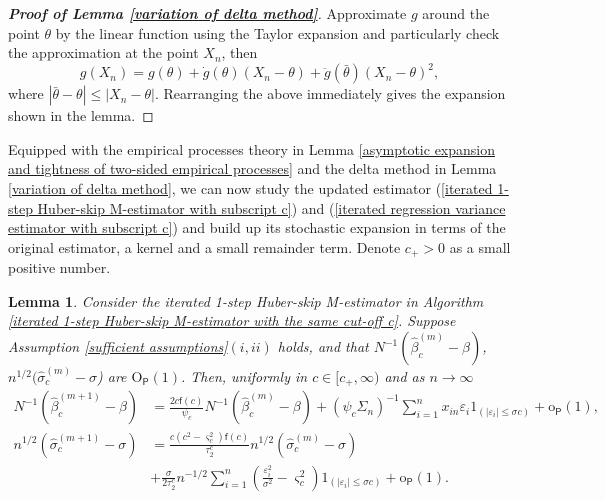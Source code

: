 \documentclass[11pt, letterpaper]{article}
\newtheorem{lemma}{Lemma}
\numberwithin{algorithm}{section}
\numberwithin{assumption}{section}
\numberwithin{lemma}{section}
\numberwithin{theorem}{section}
\numberwithin{corollary}{section}
\numberwithin{remark}{section}
\numberwithin{equation}{section}
\numberwithin{figure}{section}
\numberwithin{table}{section}
\begin{document}
\begin{proof}[\textnormal{\textbf{Proof of Lemma \ref{variation of delta method}}}]
Approximate $g$ around the point $\theta$ by the linear function using the Taylor expansion and particularly check the approximation at the point $X_{n}$, then
\begin{equation*}
g(X_{n}) = g(\theta) + \dot{g}(\theta) (X_{n} - \theta) + \ddot{g}(\bar{\theta}) (X_{n} - \theta)^{2},
\end{equation*}
where $|\bar{\theta} - \theta| \le |X_{n} - \theta|$. Rearranging the above immediately gives the expansion shown in the lemma.
\end{proof}

Equipped with the empirical processes theory in Lemma \ref{asymptotic expansion and tightness of two-sided empirical processes} and the delta method in Lemma \ref{variation of delta method}, we can now study the updated estimator (\ref{iterated 1-step Huber-skip M-estimator with subscript c}) and (\ref{iterated regression variance estimator with subscript c}) and build up its stochastic expansion in terms of the original estimator, a kernel and a small remainder term. Denote $c_{+} > 0$ as a small positive number.

\begin{lemma} \label{one step expansion of iterated estimators}
Consider the iterated 1-step Huber-skip M-estimator in Algorithm \ref{iterated 1-step Huber-skip M-estimator with the same cut-off c}. Suppose Assumption \ref{sufficient assumptions}$(i, ii)$ holds, and that $N^{-1} (\widehat{\beta}_{c}^{(m)} - \beta)$, $n^{1/2} (\widehat{\sigma}_{c}^{(m)} - \sigma$) are $\mathrm{O}_{\mathsf{P}}(1)$. Then, uniformly in $c \in [c_{+}, \infty)$ and as $n \to \infty$
\begin{align*}
N^{-1} (\widehat{\beta}_{c}^{(m+1)} - \beta) & = \frac{2c\mathsf{f}(c)}{\psi_{c}} N^{-1} (\widehat{\beta}_{c}^{(m)} - \beta) + (\psi_{c} \Sigma_{n})^{-1} \sum_{i=1}^{n} x_{in} \varepsilon_{i} 1_{(|\varepsilon_{i}| \le \sigma c)} + \mathrm{o}_{\mathsf{P}}(1), \\
n^{1/2} (\widehat{\sigma}_{c}^{(m+1)} - \sigma) & = \frac{c(c^{2} - \varsigma_{c}^{2})\mathsf{f}(c)}{\tau_{2}^{c}}n^{1/2} (\widehat{\sigma}_{c}^{(m)} - \sigma) \\
& + \frac{\sigma}{2 \tau_{2}^{c}} n^{-1/2}  \sum_{i=1}^{n} (\frac{\varepsilon_{i}^{2}}{\sigma^{2}} - \varsigma_{c}^{2}) 1_{(|\varepsilon_{i}| \le \sigma c)} + \mathrm{o}_{\mathsf{P}}(1).
\end{align*}
\end{lemma}
\end{document}
